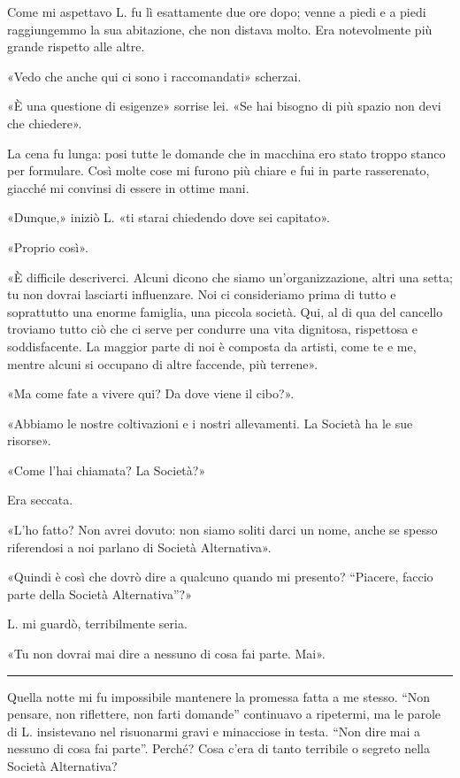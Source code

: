 \documentclass[a4paper,11pt,oneside,openright,final]{memoir}
\begin{document}
Come mi aspettavo L. fu lì esattamente due ore dopo; venne a piedi e a piedi
raggiungemmo la sua abitazione, che non distava molto. Era notevolmente più
grande rispetto alle altre.

«Vedo che anche qui ci sono i raccomandati» scherzai.

«È una questione di esigenze» sorrise lei. «Se hai bisogno di più spazio non
devi che chiedere».

La cena fu lunga: posi tutte le domande che in macchina ero stato troppo stanco
per formulare. Così molte cose mi furono più chiare e fui in parte rasserenato,
giacché mi convinsi di essere in ottime mani.

«Dunque,» iniziò L. «ti starai chiedendo dove sei capitato».

«Proprio così».

«È difficile descriverci. Alcuni dicono che siamo un'organizzazione, altri una
setta; tu non dovrai lasciarti influenzare. Noi ci consideriamo prima di tutto
e soprattutto una enorme famiglia, una piccola società. Qui, al di qua del
cancello troviamo tutto ciò che ci serve per condurre una vita dignitosa,
rispettosa e soddisfacente. La maggior parte di noi è composta da artisti, come
te e me, mentre alcuni si occupano di altre faccende, più terrene».

«Ma come fate a vivere qui? Da dove viene il cibo?».

«Abbiamo le nostre coltivazioni e i nostri allevamenti. La Società ha le sue
risorse».

«Come l'hai chiamata? La Società?»

Era seccata.

«L'ho fatto? Non avrei dovuto: non siamo soliti darci un nome, anche se spesso
riferendosi a noi parlano di Società Alternativa».

«Quindi è così che dovrò dire a qualcuno quando mi presento? ``Piacere, faccio
parte della Società Alternativa''?»

L. mi guardò, terribilmente seria.

«Tu non dovrai mai dire a nessuno di cosa fai parte. Mai».

\plainbreak{1}

Quella notte mi fu impossibile mantenere la promessa fatta a me stesso. ``Non
pensare, non riflettere, non farti domande'' continuavo a ripetermi, ma le
parole di L. insistevano nel risuonarmi gravi e minacciose in testa. ``Non dire
mai a nessuno di cosa fai parte''. Perché? Cosa c'era di tanto terribile o
segreto nella Società Alternativa?
\end{document}
